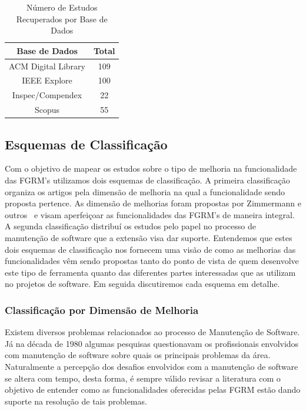 \begin{table}[htb] \centering \caption{Número de Estudos Recuperados por Base de
		Dados}\label{tab:estudos-por-base-dados} \begin{tabular}{cc} \hline
		\textbf{Base de Dados} & \textbf{Total} \\ \hline ACM Digital Library
		& 109            \\ IEEE Explore           & 100            \\
		Inspec/Compendex       & 22             \\ Scopus                 & 55
		\\ \hline \end{tabular}

\end{table}

\subsection{Esquemas de Classificação}
\label{subsec:map-esquemas-classificacao}

Com o objetivo de mapear os estudos sobre o tipo de melhoria na funcionalidade
das FGRM's utilizamos dois esquemas de classificação. A primeira classificação
organiza os artigos pela dimensão de melhoria na qual a funcionalidade sendo
proposta pertence. As dimensão de melhorias foram propostas por Zimmermann e
outros~\cite{zimmermann2009improving} e visam aperfeiçoar as funcionalidades das
FGRM's de maneira integral. A segunda classificação distribuí os estudos pelo
papel no processo de manutenção de software que a extensão visa dar suporte.
Entendemos que estes dois esquemas de classificação  nos fornecem uma visão de
como as melhorias das funcionalidades vêm sendo propostas tanto do ponto de
vista de quem desenvolve este tipo de ferramenta quanto das diferentes partes
interessadas que as utilizam no projetos de software. Em seguida discutiremos
cada esquema em detalhe.

\subsubsection{Classificação por Dimensão de Melhoria}
\label{subsubsec:map-esquema-suporte-problema}

Existem diversos problemas relacionados ao processo de Manutenção de Software.
Já na década de 1980 algumas pesquisas questionavam os profissionais envolvidos
com manutenção de software sobre quais os principais problemas da
área\cite{Lientz:1981:PAS:358790.358796}. Naturalmente a percepção dos desafios
envolvidos com a manutenção de software se altera com tempo, desta forma, é
sempre válido revisar a literatura com o objetivo de entender como as
funcionalidades oferecidas pelas FGRM estão dando suporte na resolução de tais
problemas.

